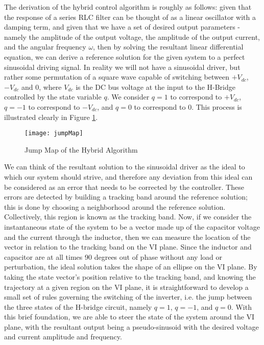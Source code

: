 The derivation of the hybrid control algorithm is roughly as follows: given that the response of a series RLC filter can be thought of as a linear oscillator with a damping term, and given that we have a set of desired output parameters - namely the amplitude of the output voltage, the amplitude of the output current, and the angular frequency $\omega$, then by solving the resultant linear differential equation, we can derive a reference solution for the given system to a perfect sinusoidal driving signal. In reality we will not have a sinusoidal driver, but rather some permutation of a square wave capable of switching between $+V_{dc}$, $-V_{dc}$ and $0$, where $V_{dc}$ is the DC bus voltage at the input to the H-Bridge controlled by the state variable $q$. We consider $q=1$ to correspond to $+V_{dc}$, $q=-1$ to correspond to $-V_{dc}$, and $q=0$ to correspond to $0$. This process is illustrated clearly in Figure \ref{jumpMap}.

\begin{figure}[htbp]
\begin{center}
\texttt{[image: jumpMap]}
\caption{Jump Map of the Hybrid Algorithm \cite{ricardo}}
\label{jumpMap}
\end{center}
\end{figure}

We can think of the resultant solution to the sinusoidal driver as the ideal to which our system should strive, and therefore any deviation from this ideal can be considered as an error that needs to be corrected by the controller. These errors are detected by building a tracking band around the reference solution; this is done by choosing a neighborhood around the reference solution. Collectively, this region is known as the tracking band. Now, if we consider the instantaneous state of the system to be a vector made up of the capacitor voltage and the current through the inductor, then we can measure the location of the vector in relation to the tracking band on the VI plane. Since the inductor and capacitor are at all times 90 degrees out of phase without any load or perturbation, the ideal solution takes the shape of an ellipse on the VI plane. By taking the state vector's position relative to the tracking band, and knowing the trajectory at a given region on the VI plane, it is straightforward to develop a small set of rules governing the switching of the inverter, i.e. the jump between the three states of the H-bridge circuit, namely $q=1$, $q=-1$, and $q=0$. With this brief foundation, we are able to steer the state of the system around the VI plane, with the resultant output being a pseudo-sinusoid with the desired voltage and current amplitude and frequency. 

